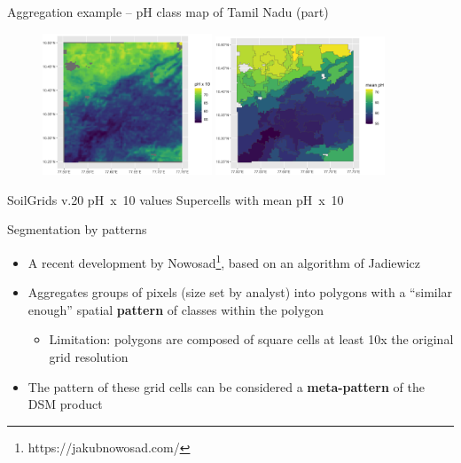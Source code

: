 \documentclass[aspectratio=169, 10pt]{beamer}
\begin{document}
\begin{frame}{Aggregation example -- pH class map of Tamil Nadu (part)}
    \begin{figure}
      \includegraphics[width=0.45\textwidth]{graphics_david/SLIC-source-1.png}
      \hfill
      \includegraphics[width=0.45\textwidth]{graphics_david/supercells-not-compact-1.png}
    \end{figure}
    SoilGrids v.20 pH~x~10 values \hfill Supercells with mean pH~x~10
\end{frame}



\begin{frame}{Segmentation by patterns}
\begin{itemize}
    \item 
A recent development by Nowosad\footnote{https://jakubnowosad.com/}, based on an algorithm of Jadiewicz    
\item Aggregates groups of pixels (size set by analyst) into polygons with a ``similar enough'' spatial \textbf{pattern} of classes within the polygon
  \begin{itemize}
  \item Limitation: polygons are composed of square cells at least 10x the original grid resolution
  \end{itemize}
\item The pattern of these grid cells can be considered a \textbf{meta-pattern} of the DSM product
\end{itemize}
\end{frame}
\end{document}
